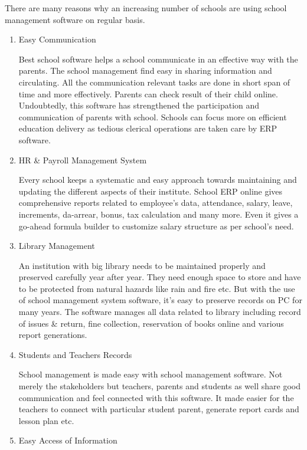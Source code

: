 \documentclass[a4paper]{article}
\begin{document}
There are many reasons why an increasing number of schools are using school
management software on regular basis.
\begin{enumerate}
  \item Easy Communication 

    Best school software helps a school communicate in an effective way
    with the parents. The school management find easy in sharing
    information and circulating. All the communication relevant tasks are
    done in short span of time and more effectively. Parents can check
    result of their child online. Undoubtedly, this software has
    strengthened the participation and communication of parents with
    school. Schools can focus more on efficient education delivery as
    tedious clerical operations are taken care by ERP software.

  \item HR \& Payroll Management System

    Every school keeps a systematic and easy approach towards maintaining
    and updating the different aspects of their institute. School ERP
    online gives comprehensive reports related to employee’s data,
    attendance, salary, leave, increments, da-arrear, bonus, tax
    calculation and many more. Even it gives a go-ahead formula builder to
    customize salary structure as per school’s need.

  \item Library Management

    An institution with big library needs to be maintained properly and
    preserved carefully year after year. They need enough space to store
    and have to be protected from natural hazards like rain and fire etc.
    But with the use of school management system software, it’s easy to
    preserve records on PC for many years. The software manages all data
    related to library including record of issues \& return, fine
    collection, reservation of books online and various report generations.

  \item Students and Teachers Records

    School management is made easy with school management software. Not
    merely the stakeholders but teachers, parents and students as well
    share good communication and feel connected with this software. It
    made easier for the teachers to connect with particular student parent,
    generate report cards and lesson plan etc.

  \item Easy Access of Information


\end{enumerate}
\end{document}
